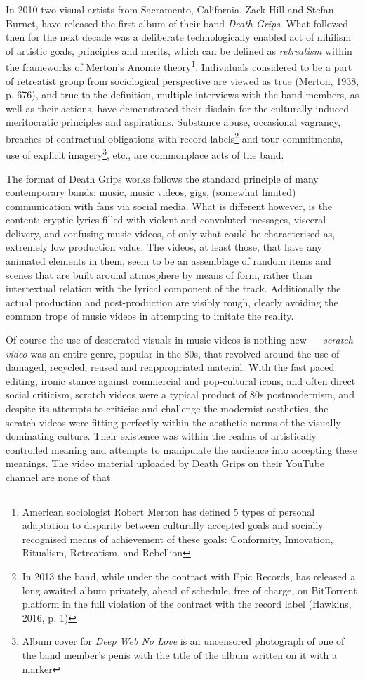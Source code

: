 \documentclass[a4paper, 11pt]{article}
\begin{document}
In 2010 two visual artists from Sacramento, California, Zack Hill and Stefan Burnet, have released the first album of their band \textit{Death Grips}. What followed then for the next decade was a deliberate technologically enabled act of nihilism of artistic goals, principles and merits, which can be defined as \textit{retreatism} within the frameworks of Merton’s Anomie theory\footnote{American sociologist Robert Merton has defined 5 types of personal adaptation to disparity between culturally accepted goals and socially recognised means of achievement of these goals: Conformity, Innovation, Ritualism, Retreatism, and Rebellion}.  Individuals considered to be a part of retreatist group from sociological perspective are viewed as true (Merton, 1938, p. 676), and true to the definition, multiple interviews with the band members, as well as their actions, have demonstrated their disdain for the culturally induced meritocratic principles and aspirations. Substance abuse, occasional vagrancy, breaches of contractual obligations with record labels\footnote{In 2013 the band, while under the contract with Epic Records, has released a long awaited album privately, ahead of schedule, free of charge, on BitTorrent platform in the full violation of the contract with the record label (Hawkins, 2016, p. 1)} and tour commitments, use of explicit imagery\footnote{Album cover for \textit{Deep Web No Love} is an uncensored photograph of one of the band member’s penis with the title of the album written on it with a marker}, etc., are commonplace acts of the band.

The format of Death Grips works follows the standard principle of many contemporary bands: music, music videos, gigs, (somewhat limited) communication with fans via social media. What is different however, is the content: cryptic lyrics filled with violent and convoluted messages, visceral delivery, and confusing music videos, of only what could be characterised as, extremely low production value. The videos, at least those, that have any animated elements in them, seem to be an assemblage of random items and scenes that are built around atmosphere by means of form, rather than intertextual relation with the lyrical component of the track. Additionally the actual production and post-production are visibly rough, clearly avoiding the common trope of music videos in attempting to imitate the reality.

Of course the use of desecrated visuals in music videos is nothing new — \textit{scratch video} was an entire genre, popular in the 80s, that revolved around the use of damaged, recycled, reused and reappropriated material. With the fast paced editing, ironic stance against commercial and pop-cultural icons, and often direct social criticism, scratch videos were a typical product of 80s postmodernism, and despite its attempts to criticise and challenge the modernist aesthetics, the scratch videos were fitting perfectly within the aesthetic norms of the visually dominating culture. Their existence was within the realms of artistically controlled meaning and attempts to manipulate the audience into accepting these meanings. The video material uploaded by Death Grips on their YouTube channel are none of that.
\end{document}
